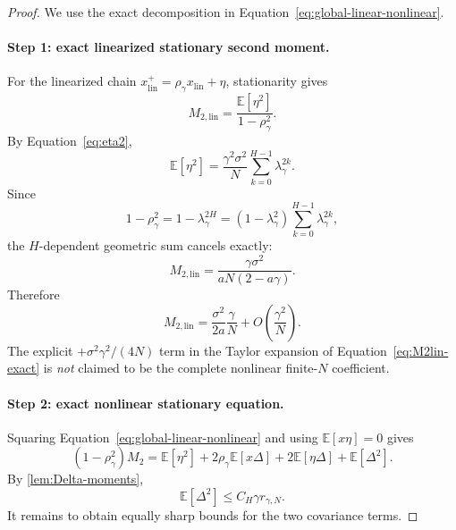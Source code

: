 \documentclass[11pt]{article}
\theoremstyle{definition}
\newcommand{\E}{\mathbb{E}}
\newcommand{\remscale}{r_{\gamma,N}}
\begin{document}
\begin{proof}
We use the exact decomposition in Equation~\eqref{eq:global-linear-nonlinear}.

\paragraph{Step 1: exact linearized stationary second moment.}
For the linearized chain $x_{\mathrm{lin}}^+=\rho_\gamma x_{\mathrm{lin}}+\eta$, stationarity gives
\[
  M_{2,\mathrm{lin}}=\frac{\E[\eta^2]}{1-\rho_\gamma^2}.
\]
By Equation~\eqref{eq:eta2},
\[
  \E[\eta^2]
  =\frac{\gamma^2\sigma^2}{N}\sum_{k=0}^{H-1}\lambda_\gamma^{2k}.
\]
Since
\[
  1-\rho_\gamma^2
  =1-\lambda_\gamma^{2H}
  =(1-\lambda_\gamma^2)\sum_{k=0}^{H-1}\lambda_\gamma^{2k},
\]
the $H$-dependent geometric sum cancels exactly:
\begin{equation}
\label{eq:M2lin-exact}
  M_{2,\mathrm{lin}}
  =\frac{\gamma\sigma^2}{aN(2-a\gamma)}.
\end{equation}
Therefore
\begin{equation}
\label{eq:M2lin-first}
  M_{2,\mathrm{lin}}
  =\frac{\sigma^2}{2a}\frac{\gamma}{N}
  +O\left(\frac{\gamma^2}{N}\right).
\end{equation}
The explicit $+\sigma^2\gamma^2/(4N)$ term in the Taylor expansion of Equation~\eqref{eq:M2lin-exact} is \emph{not} claimed to be the complete nonlinear finite-$N$ coefficient.

\paragraph{Step 2: exact nonlinear stationary equation.}
Squaring Equation~\eqref{eq:global-linear-nonlinear} and using $\E[x\eta]=0$ gives
\begin{equation}
\label{eq:M2-nonlinear-eq}
  (1-\rho_\gamma^2)M_2
  =\E[\eta^2]
  +2\rho_\gamma\E[x\Delta]
  +2\E[\eta\Delta]
  +\E[\Delta^2].
\end{equation}
By \cref{lem:Delta-moments},
\begin{equation}
\label{eq:Delta2-rscale}
  \E[\Delta^2]\le C_H\gamma\remscale.
\end{equation}
It remains to obtain equally sharp bounds for the two covariance terms.


\end{proof}
\end{document}
